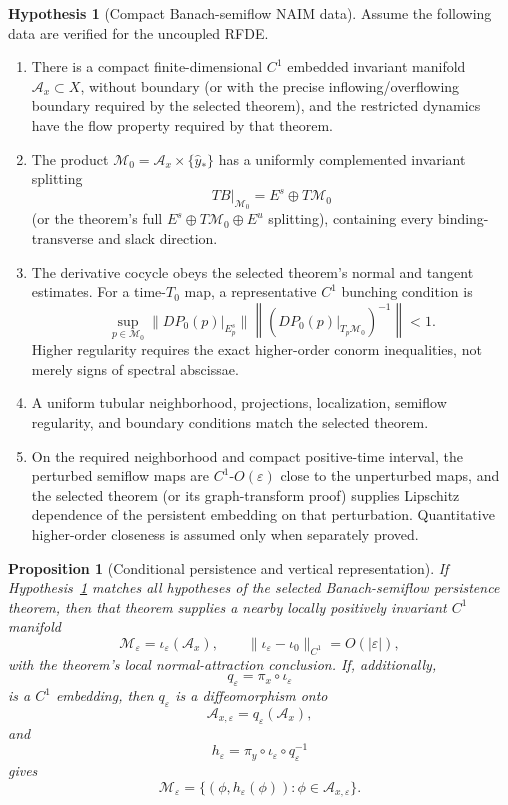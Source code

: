 \documentclass[11pt]{article}
\newtheorem{proposition}{Proposition}
\theoremstyle{definition}
\newtheorem{hypothesis}{Hypothesis}
\theoremstyle{remark}
\begin{document}
\begin{hypothesis}[Compact Banach-semiflow NAIM data]
\label{hyp:naim}
Assume the following data are verified for the uncoupled RFDE.
\begin{enumerate}
\item There is a compact finite-dimensional $C^1$ embedded invariant manifold $\mathcal A_x\subset X$, without boundary (or with the precise inflowing/overflowing boundary required by the selected theorem), and the restricted dynamics have the flow property required by that theorem.
\item The product $\mathcal M_0=\mathcal A_x\times\{\widehat y_*\}$ has a uniformly complemented invariant splitting
\[
TB|_{\mathcal M_0}=E^s\oplus T\mathcal M_0
\]
(or the theorem's full $E^s\oplus T\mathcal M_0\oplus E^u$ splitting), containing every binding-transverse and slack direction.
\item The derivative cocycle obeys the selected theorem's normal and tangent estimates. For a time-$T_0$ map, a representative $C^1$ bunching condition is
\[
\sup_{p\in\mathcal M_0}
\|DP_0(p)|_{E_p^s}\|
\left\|(DP_0(p)|_{T_p\mathcal M_0})^{-1}\right\|<1.
\]
Higher regularity requires the exact higher-order conorm inequalities, not merely signs of spectral abscissae.
\item A uniform tubular neighborhood, projections, localization, semiflow regularity, and boundary conditions match the selected theorem.
\item On the required neighborhood and compact positive-time interval, the perturbed semiflow maps are $C^1$-$O(\varepsilon)$ close to the unperturbed maps, and the selected theorem (or its graph-transform proof) supplies Lipschitz dependence of the persistent embedding on that perturbation. Quantitative higher-order closeness is assumed only when separately proved.
\end{enumerate}
\end{hypothesis}

\begin{proposition}[Conditional persistence and vertical representation]
\label{prop:conditional}
If Hypothesis~\ref{hyp:naim} matches all hypotheses of the selected Banach-semiflow persistence theorem, then that theorem supplies a nearby locally positively invariant $C^1$ manifold
\[
\mathcal M_\varepsilon=\iota_\varepsilon(\mathcal A_x),
\qquad
\|\iota_\varepsilon-\iota_0\|_{C^1}=O(|\varepsilon|),
\]
with the theorem's local normal-attraction conclusion. If, additionally,
\[
q_\varepsilon=\pi_x\circ\iota_\varepsilon
\]
is a $C^1$ embedding, then $q_\varepsilon$ is a diffeomorphism onto
\[
\mathcal A_{x,\varepsilon}=q_\varepsilon(\mathcal A_x),
\]
and
\[
h_\varepsilon=
\pi_y\circ\iota_\varepsilon\circ q_\varepsilon^{-1}
\]
gives
\[
\mathcal M_\varepsilon
=\{(\phi,h_\varepsilon(\phi)): \phi\in\mathcal A_{x,\varepsilon}\}.
\]
\end{proposition}
\end{document}
